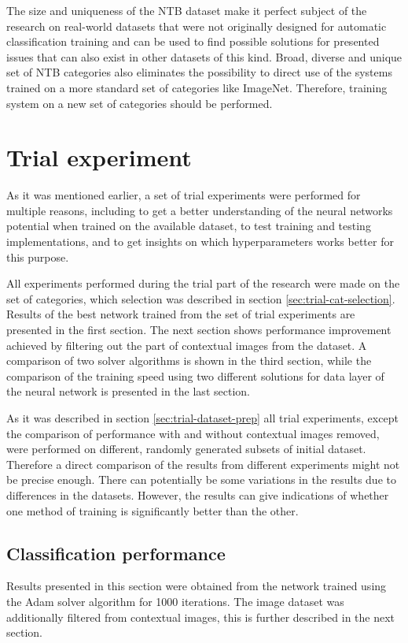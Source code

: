 The size and uniqueness of the NTB dataset make it perfect subject of the research on real-world datasets that were not originally designed for automatic classification training and can be used to find possible solutions for presented issues that can also exist in other datasets of this kind. Broad, diverse and unique set of NTB categories also eliminates the possibility to direct use of the systems trained on a more standard set of categories like ImageNet. Therefore, training system on a new set of categories should be performed.


\section{Trial experiment}
As it was mentioned earlier, a set of trial experiments were performed for multiple reasons, including to get a better understanding of the neural networks potential when trained on the available dataset, to test training and testing implementations, and to get insights on which hyperparameters works better for this purpose.

All experiments performed during the trial part of the research were made on the set of categories, which selection was described in section \ref{sec:trial-cat-selection}. Results of the best network trained from the set of trial experiments are presented in the first section. The next section shows performance improvement achieved by filtering out the part of contextual images from the dataset. A comparison of two solver algorithms is shown in the third section, while the comparison of the training speed using two different solutions for data layer of the neural network is presented in the last section.

As it was described in section \ref{sec:trial-dataset-prep} all trial experiments, except the comparison of performance with and without contextual images removed, were performed on different, randomly generated subsets of initial dataset. Therefore a direct comparison of the results from different experiments might not be precise enough. There can potentially be some variations in the results due to differences in the datasets. However, the results can give indications of whether one method of training is significantly better than the other.

\subsection{Classification performance}
    Results presented in this section were obtained from the network trained using the Adam solver algorithm for 1000 iterations. The image dataset was additionally filtered from contextual images, this is further described in the next section.
    
